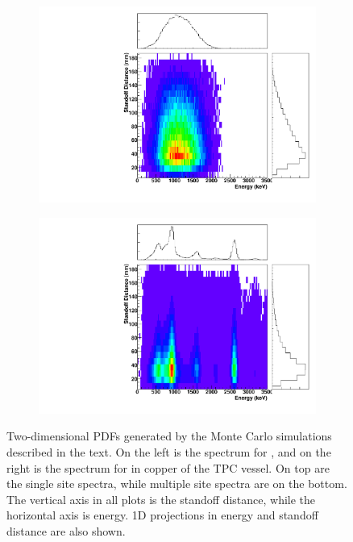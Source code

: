 \documentclass[herrin-thesis.tex]{subfiles}
\begin{document}
\begin{figure}[htbp]
\begin{subfigure}[b]{0.48\textwidth}
	\end{subfigure}
	\begin{subfigure}[b]{0.48\textwidth}
	\centering
	\includegraphics[width=\textwidth]{./plots/PDFs/analysis_pdf_bb2n_ms.pdf}
	\end{subfigure}\hfill%
	\begin{subfigure}[b]{0.48\textwidth}
	\centering
	\includegraphics[width=\textwidth]{./plots/PDFs/analysis_pdf_AllVessel_Th232_ms.pdf}
	\end{subfigure}
\caption[Examples of 2D PDFs]{Two-dimensional PDFs generated by the Monte Carlo simulations described in the text. On the left is the spectrum for \twonu{}, and on the right is the spectrum for  in copper of the TPC vessel. On top are the single site spectra, while multiple site spectra are on the bottom. The vertical axis in all plots is the standoff distance, while the horizontal axis is energy. 1D projections in energy and standoff distance are also shown.}
\label{fig:analysis_example_PDFs}
\end{figure}
\end{document}
